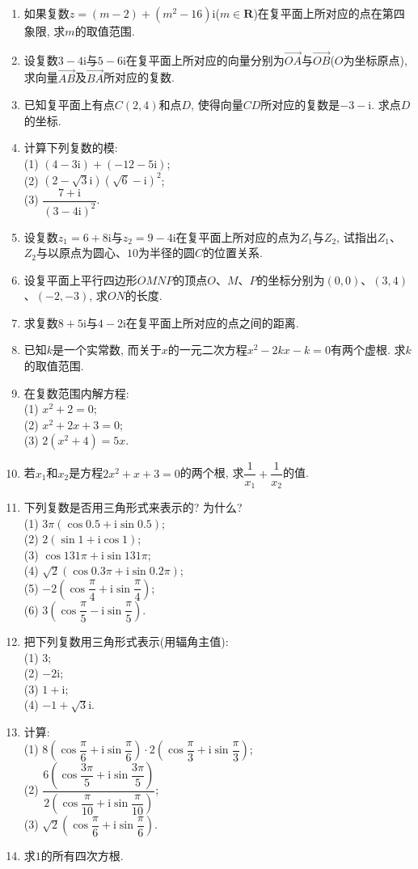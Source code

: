 \documentclass[10pt,a4paper]{article}
\begin{document}
\begin{enumerate}[1.]
\item 如果复数$z=(m-2)+(m^2-16)\mathrm{i}$($m\in \mathbf{R}$)在复平面上所对应的点在第四象限, 求$m$的取值范围.
\item 设复数$3-4\mathrm{i}与5-6\mathrm{i}$在复平面上所对应的向量分别为$\overrightarrow{OA}$与$\overrightarrow{OB}$($O$为坐标原点), 求向量$\overrightarrow{AB}$及$\overrightarrow{BA}$所对应的复数.
\item 已知复平面上有点$C(2, 4)$和点$D$, 使得向量$CD$所对应的复数是$-3-\mathrm{i}$. 求点$D$的坐标.
\item 计算下列复数的模:\\
(1) $(4-3\mathrm{i})+(-12-5\mathrm{i})$;\\
(2) $(2-\sqrt 3\mathrm{i})(\sqrt 6-\mathrm{i})^2$;\\
(3) $\dfrac{7+\mathrm{i}}{(3-4\mathrm{i})^2}$.
\item 设复数$z_1=6+8\mathrm{i}$与$z_2=9-4\mathrm{i}$在复平面上所对应的点为$Z_1$与$Z_2$, 试指出$Z_1$、$Z_2$与以原点为圆心、$10$为半径的圆$C$的位置关系.
\item 设复平面上平行四边形$OMNP$的顶点$O$、$M$、$P$的坐标分别为$(0, 0)$、$(3, 4)$、$(-2, -3)$, 求$ON$的长度.
\item 求复数$8+5\mathrm{i}$与$4-2\mathrm{i}$在复平面上所对应的点之间的距离. 
\item 已知$k$是一个实常数, 而关于$x$的一元二次方程$x^2-2kx-k=0$有两个虚根. 求$k$的取值范围.
\item 在复数范围内解方程:\\
(1) $x^2+2=0$;\\
(2) $x^2+2x+3=0$;\\
(3) $2(x^2+4)=5x$.
\item 若$x_1$和$x_2$是方程$2x^2+x+3=0$的两个根, 求$\dfrac 1{x_1}+\dfrac1{x_2}$的值.
\item 下列复数是否用三角形式来表示的? 为什么?\\
(1) $3\pi (\cos 0.5+\mathrm{i}\sin 0.5)$;\\
(2) $2(\sin 1+\mathrm{i}\cos 1)$;\\
(3) $\cos 131\pi +\mathrm{i}\sin 131\pi$;\\
(4) $\sqrt 2(\cos 0.3\pi +\mathrm{i}\sin 0.2\pi)$;\\
(5) $-2(\cos \dfrac \pi 4+\mathrm{i}\sin\dfrac \pi 4)$;\\
(6) $3(\cos \dfrac\pi 5-\mathrm{i}\sin\dfrac \pi 5)$.
\item 把下列复数用三角形式表示(用辐角主值):\\
(1) $3$;\\
(2) $-2\mathrm{i}$;\\
(3) $1+\mathrm{i}$;\\
(4) $-1+\sqrt 3\mathrm{i}$.
\item 计算:\\
(1) $8(\cos \dfrac\pi 6+\mathrm{i}\sin \dfrac\pi 6)\cdot 2(\cos \dfrac\pi 3+\mathrm{i}\sin\dfrac \pi 3)$;\\
(2) $\dfrac{6(\cos \dfrac{3\pi} 5+\mathrm{i}\sin \dfrac{3\pi} 5)}{2(\cos \dfrac\pi {10}+\mathrm{i}\sin \dfrac\pi {10})}$;\\
(3) $\sqrt 2(\cos \dfrac\pi 6+\mathrm{i}\sin \dfrac\pi 6)$.
\item 求$1$的所有四次方根. 
\end{enumerate}
\end{document}
